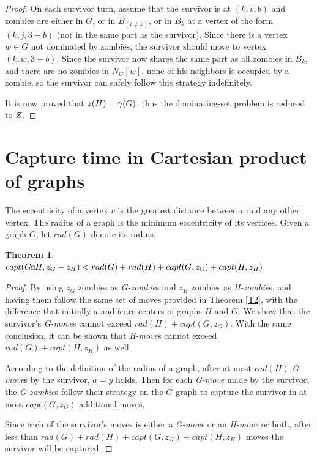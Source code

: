 \documentclass[1p]{elsarticle}
\newtheorem{theorem}{Theorem}
\newcommand{\NPZ}{\ooalign{$Z$\cr\hfil\rule[.8ex]{.3em}{.09ex}\hfil\cr}}
\newcommand{\zn}{\ooalign{$z$\cr\hfil\rule[.5ex]{.2em}{.08ex}\hfil\cr}}
\newcommand{\sq}[1][black]{%
\begin{tikzpicture}                                                           
  \draw[#1] (2pt,0pt) -- (6pt,0pt);   
  \draw[#1] (2pt,0pt) -- (2pt,4pt);    
  \draw[#1] (2pt,4pt) -- (6pt,4pt);   
  \draw[#1] (6pt,0pt) -- (6pt,4pt);
\end{tikzpicture}%
}
\begin{document}
\begin{proof}
		On each survivor turn, assume that the survivor is at $(k,v,b)$ and zombies are either in $G$, or in $B_{(i \neq
		k)}$, or in $B_k$ at a vertex of the form $(k,j,3-b)$ (not in the same part as the survivor). Since there is a
		vertex $w \in G$ not dominated by zombies, the survivor should move to vertex $(k,w,3-b)$. Since the survivor
		now shares the same part as all zombies in $B_k$, and there are no zombies in $N_G[w]$, none of his neighbors is
		occupied by a zombie, so the survivor can safely follow this strategy indefinitely.

		It is now proved that $\zn(H) = \gamma(G)$, thus the dominating-set problem is reduced to $\NPZ$.

	\end{proof}

\section{Capture time in Cartesian product of graphs}\label{capturetime} 

	The eccentricity of a vertex $v$ is the greatest distance between $v$ and any other vertex. The radius of a graph is the
	minimum eccentricity of its vertices. Given a graph $G$, let $rad(G)$ denote its radius.
	\begin{theorem}
		\label{T5}
		$capt( G \sq H, z_G + z_H ) < rad(G) + rad(H) + capt(G, z_G) + capt(H, z_H)$
	\end{theorem}
	\begin{proof}
		By using $z_G$ zombies as {\it G-zombie}s and $z_H$ zombies as {\it H-zombie}s, and having them follow the same
		set of moves provided in Theorem \ref{T2}, with the difference that initially $a$ and $b$ are centers of graphs
		$H$ and $G$. We show that the survivor's {\it G-move}s cannot exceed $rad(H) + capt(G, z_G)$. With the same
		conclusion, it can be shown that {\it H-move}s cannot exceed $rad(G) + capt(H, z_H)$ as well.

		According to the definition of the radius of a graph, after at most $rad(H)$ {\it G-move}s by the survivor, $a =
		y$ holds. Then for each {\it G-move} made by the survivor, the {\it G-zombie}s follow their strategy on the $G$
		graph to capture the survivor in at most $capt(G,z_G)$ additional moves.
		
		Since each of the survivor's moves is either a {\it G-move} or an {\it H-move} or both, after less than $rad(G)
		+ rad(H) + capt(G, z_G) + capt(H, z_H)$ moves the survivor will be captured.
	\end{proof}
\end{document}
